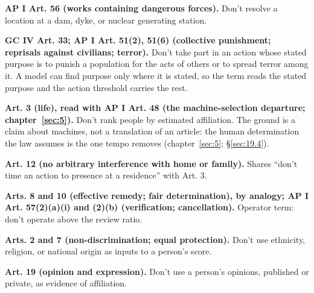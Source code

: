 \textbf{AP I Art. 56 (works containing dangerous forces).} Don't resolve a location at a dam, dyke, or nuclear generating station.

\textbf{GC IV Art. 33; AP I Art. 51(2), 51(6) (collective punishment; reprisals against civilians; terror).} Don't take part in an action whose stated purpose is to punish a population for the acts of others or to spread terror among it. A model can find purpose only where it is stated, so the term reads the stated purpose and the action threshold carries the rest.

\textbf{Art. 3 (life), read with AP I Art. 48 (the machine-selection departure; chapter~\ref{sec:5}).} Don't rank people by estimated affiliation. The ground is a claim about machines, not a translation of an article: the human determination the law assumes is the one tempo removes (chapter~\ref{sec:5}; \S\ref{sec:19.4}).

\textbf{Art. 12 (no arbitrary interference with home or family).} Shares “don't time an action to presence at a residence” with Art. 3.

\textbf{Arts. 8 and 10 (effective remedy; fair determination), by analogy; AP I Art. 57(2)(a)(i) and (2)(b) (verification; cancellation).} Operator term: don't operate above the review ratio.

\textbf{Arts. 2 and 7 (non-discrimination; equal protection).} Don't use ethnicity, religion, or national origin as inputs to a person's score.

\textbf{Art. 19 (opinion and expression).} Don't use a person's opinions, published or private, as evidence of affiliation.

